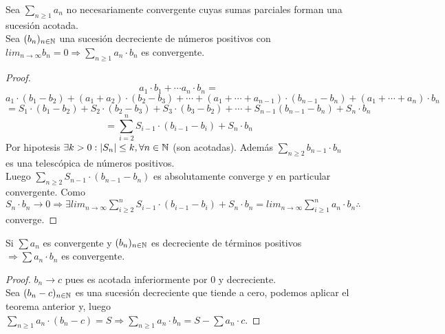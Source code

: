 \begin{theorem}
  Sea $\sum_{n \geq 1} a_n$ no necesariamente convergente cuyas sumas parciales forman una sucesión acotada. \\
  Sea $(b_n)_{n \in \mathbb{N}}$ una sucesión decreciente de números positivos con $lim_{n \to \infty} b_n = 0 \Rightarrow \sum_{n \geq 1} a_n \cdot b_n$ es convergente.

  \begin{proof}
    \begin{equation}
      a_1 \cdot b_1 + \cdots a_n \cdot b_n =
    \end{equation}
    \begin{equation}
      a_1 \cdot (b_1 - b_2) + (a_1 + a_2) \cdot (b_2 - b_3) + \cdots + (a_1 + \cdots + a_{n-1}) \cdot (b_{n-1} - b_n) + (a_1 + \cdots + a_n) \cdot b_n
    \end{equation}
    \begin{equation}
      = S_1 \cdot (b_1 - b_2) + S_2 \cdot (b_2 - b_3) + S_3 \cdot (b_3 - b_2) + \cdots + S_{n-1} (b_{n-1} - b_n) + S_n \cdot b_n
    \end{equation}
    \begin{equation}
      = \sum_{i = 2}^n S_{i-1} \cdot (b_{i-1} - b_i) + S_n \cdot b_n
    \end{equation}
    Por hipotesis $\exists k > 0 : |S_n| \leq k, \forall n \in \mathbb{N}$ (son acotadas). Además $\sum_{n \geq 2} b_{n-1} \cdot b_n$ es una telescópica de números positivos. \\
    Luego $\sum_{n \geq 2} S_{n-1} \cdot (b_{n-1} - b_n)$ es absolutamente converge y en particular convergente.
    Como $S_n \cdot b_n \to 0 \Rightarrow \exists lim_{n \to \infty} \sum_{i \geq 2}^n S_{i-1} \cdot (b_{i-1} - b_i) + S_n \cdot b_n = lim_{n \to \infty} \sum_{i \geq 1}^n a_n \cdot b_n \therefore$ converge.
  \end{proof}
\end{theorem}

\begin{corollary}[Abel]
  Si $\sum a_n$ es convergente y $(b_n)_{n \in \mathbb{N}}$ es decreciente de términos positivos $\Rightarrow \sum a_n \cdot b_n$ es convergente.
  \begin{proof}
    $b_n \to c$ pues es acotada inferiormente por $0$ y decreciente. \\
    Sea $(b_n - c)_{n \in \mathbb{N}}$ es una sucesión decreciente que tiende a cero, podemos aplicar el teorema anterior y, luego $\sum_{n \geq 1} a_n \cdot (b_n - c) = S \Rightarrow \sum_{n \geq 1} a_n \cdot b_n = S - \sum a_n \cdot c$.
  \end{proof}
\end{corollary}


